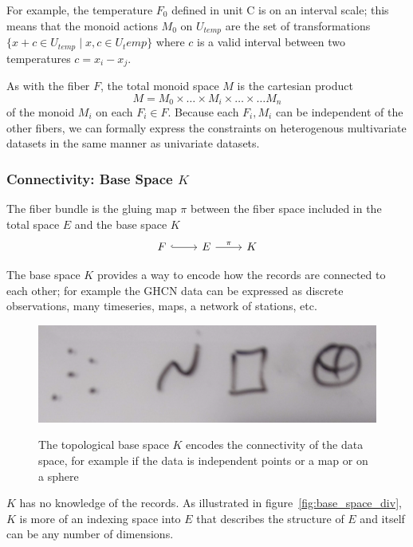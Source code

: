 \documentclass[../main.tex]{subfiles}
\begin{document}
For example, the temperature $F_0$ defined in unit \textdegree C is on an interval scale; this means that the monoid actions $M_0$ on $U_{temp}$ are the set of transformations $\{x + c \in U_{temp} \mid x,c \in U_temp\}$ where $c$ is a valid interval between two temperatures $c=x_i-x_j$.

As with the fiber $F$, the total monoid space $M$ is the cartesian product
\begin{equation}
M = M_{0} \times \ldots \times M_{i}\times \ldots \times\ldots M_{n}
\end{equation}
of the monoid $M_{i}$ on each $F_{i}\in F$. Because each $F_i, M_i$ can be independent of the other fibers, we can formally express the constraints on heterogenous multivariate datasets in the same manner as univariate datasets. 

\subsubsection{Connectivity: Base Space $K$} 
\label{sec:data_base}
The fiber bundle is the gluing map $\pi$ between the fiber space included in the total space $E$ and the base space $K$
\begin{equation}
    \label{eq:fiber_bundle}
    \begin{tikzcd}
        F \arrow[r, hook] & E \arrow[r, "\pi"] & K
    \end{tikzcd}
\end{equation}

The base space $K$ provides a way to encode how the records are connected to each other; for example the GHCN data can be expressed as discrete observations, many timeseries, maps, a network of stations, etc.

\begin{figure}[ht!]
    \includegraphics[width=.5\textwidth]{figures/math/k_different_types.png}
    \label{fig:base_space_types}
    \caption{The topological base space $K$ encodes the connectivity of the data space, for example if the data is independent points or a map or on a sphere}
\end{figure}

$K$ has no knowledge of the records. As illustrated in figure~\ref{fig:base_space_div}, $K$ is more of an indexing space into $E$ that describes the structure of $E$ and itself can be any number of dimensions. 
\end{document}
